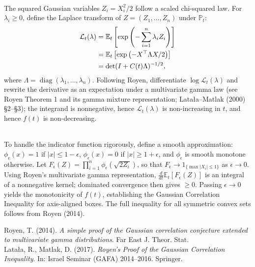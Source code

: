 \begin{technical}
\\
The squared Gaussian variables \( Z_i = X_i^2 / 2 \) follow a scaled chi-squared law. For \( \lambda_i \ge 0 \), define the Laplace transform of \( Z = (Z_1, \dots, Z_n) \) under \( \mathbb{P}_t \):
\begin{align*}
\mathcal{L}_t(\lambda) 
&= \mathbb{E}_t \left[ \exp\left( -\sum_{i=1}^n \lambda_i Z_i \right) \right] \notag \\
&= \mathbb{E}_t \left[ \exp\left( -X^\top \Lambda X / 2 \right) \right] \notag \\
&= \det(I + C(t) \Lambda)^{-1/2}, \label{eq:laplace}
\end{align*}
where \( \Lambda = \operatorname{diag}(\lambda_1, \dots, \lambda_n) \). Following Royen, differentiate \( \log \mathcal{L}_t(\lambda) \) and rewrite the derivative as an expectation under a multivariate gamma law (see Royen Theorem 1 and its gamma mixture representation; Latała–Matlak (2000) §2–§3); the integrand is nonnegative, hence \( \mathcal{L}_t(\lambda) \) is non-increasing in \( t \), and hence \( f(t) \) is non-decreasing.

\\
To handle the indicator function rigorously, define a smooth approximation:
$\phi_\epsilon(x) = 1$ if $|x| \le 1 - \epsilon$, $\phi_\epsilon(x) = 0$ if $|x| \ge 1 + \epsilon$, and $\phi_\epsilon$ is smooth monotone otherwise.
Let $F_\epsilon(Z) = \prod_{i=1}^n \phi_\epsilon\left(\sqrt{2Z_i}\right)$, so that \( F_\epsilon \to 1_{\{\max |X_i| \le 1\}} \) as \( \epsilon \to 0 \). Using Royen's multivariate gamma representation, \( \frac{d}{dt} \mathbb{E}_t[F_\epsilon(Z)] \) is an integral of a nonnegative kernel; dominated convergence then gives \( \ge 0 \). Passing \( \epsilon \to 0 \) yields the monotonicity of \( f(t) \), establishing the Gaussian Correlation Inequality for axis-aligned boxes. The full inequality for all symmetric convex sets follows from Royen (2014).

\techref
{\footnotesize
Royen, T. (2014). \textit{A simple proof of the Gaussian correlation conjecture extended to multivariate gamma distributions}. Far East J. Theor. Stat.\\
Latała, R., Matlak, D. (2017). \textit{Royen's Proof of the Gaussian Correlation Inequality}. In: Israel Seminar (GAFA) 2014–2016. Springer.
}
\end{technical}
